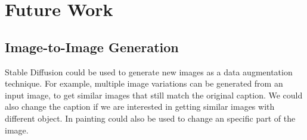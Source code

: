 
\section{Future Work}

\subsection{Image-to-Image Generation}

Stable Diffusion could be used to generate new images as a data augmentation technique. For example, multiple image variations can be generated from an input image, to get similar images that still match the original caption. We could also change the caption if we are interested in getting similar images with different object. In painting could also be used to change an specific part of the image.